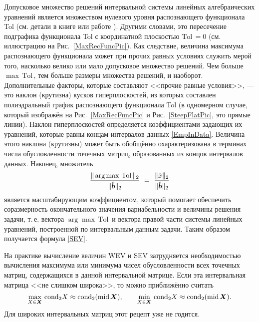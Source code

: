 \documentclass[a5paper,openany]{book}
\newcommand{\mbf}[1]{\protect\text{\boldmath$#1$}}
\newcommand{\m}{\mathrm{mid}\;}
\newcommand{\Tol}{\mathrm{Tol}\,}
\newcommand{\cond}{\mathrm{cond}}
\begin{document}
  
Допусковое множество решений интервальной системы линейных алгебраических уравнений 
является множеством нулевого уровня распознающего функционала Tol (см. детали в книге 
\cite{SSharyBook} или работе \cite{SShary2012}). Другими словами, это пересечение 
подграфика функционала Tol с координатной плоскостью $\Tol = 0$ (см. иллюстрацию на 
Рис.~\ref{MaxRecFuncPic}). Как следствие, величина максимума распознающего функционала 
может при прочих равных условиях служить мерой того, насколько велико или мало 
допусковое множество решений. Чем больше $\max\,\Tol$, тем больше размеры множества 
решений, и наоборот. Дополнительные факторы, которые составляют <<прочие равные 
условия>>,  --- это наклон (крутизна) кусков гиперплоскостей, из которых составлен 
полиэдральный график распознающего функционала Tol (в одномерном случае, который 
изображён на Рис.~\ref{MaxRecFuncPic} и Рис.~\ref{SteepFlatPic}, это прямые линии). 
Наклон гиперплоскостей определяется коэффициентами задающих их уравнений, которые 
равны концам интервалов данных \eqref{EmpInData}. Величина этого наклона (крутизны) 
может быть обобщённо охарактеризована в терминах числа обусловленности точечных 
матриц, образованных из концов интервалов данных.  Наконец, множитель 
\begin{equation*}
\frac{\|\arg\max\,\Tol\|_{2}}{\|\hat{\mbf{b}}\|_2} \ 
   = \  \frac{\|\hat{x}\|_2}{\|\hat{\mbf{b}}\|_2} 
\end{equation*}
является масштабирующим коэффициентом, который помогает обеспечить соразмерность 
окончательного значения вариабельности и величины решения задачи, т.\,е. вектора 
$\arg\max\,\Tol$ и вектора правой части системы линейных уравнений, построенной 
по интервальным данным задачи. Таким образом получается формула \eqref{SEV}. 
  
На практике вычисление величин WEV и SEV затрудняется необходимостью вычисления 
максимума или минимума чисел обусловленности всех точечных матриц, содержащихся 
в данной интервальной матрице. Если эта интервальная матрица <<не слишком широка>>, 
то можно приближённо считать 
\begin{equation*} 
\max_{X\in\mbf{X}}\,\cond_{2} X \approx \cond_{2}(\m\!\mbf{X}),  
  \qquad \min_{X\in\mbf{X}}\,\cond_{2} X \approx \cond_{2}(\m\!\mbf{X}). 
\end{equation*} 
Для широких интервальных матриц этот рецепт уже не годится. 
  
\end{document}
